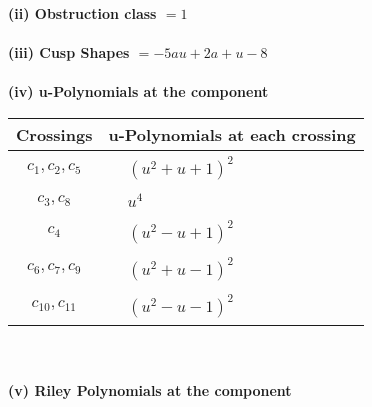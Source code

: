 \documentclass[1p]{elsarticle_modified}
\theoremstyle{definition}
\begin{document}
\flushleft \textbf{(ii) Obstruction class $= 1$}\\~\\
\flushleft \textbf{(iii) Cusp Shapes $= -5 a u+2 a+u-8$}\\~\\
\newpage\renewcommand{\arraystretch}{1}
\flushleft \textbf{(iv) u-Polynomials at the component}\newline \\
\begin{tabular}{m{50pt}|m{274pt}}
Crossings & \hspace{64pt}u-Polynomials at each crossing \\
\hline $$\begin{aligned}c_{1},c_{2},c_{5}\end{aligned}$$&$\begin{aligned}
&(u^2+u+1)^2
\end{aligned}$\\
\hline $$\begin{aligned}c_{3},c_{8}\end{aligned}$$&$\begin{aligned}
&u^4
\end{aligned}$\\
\hline $$\begin{aligned}c_{4}\end{aligned}$$&$\begin{aligned}
&(u^2- u+1)^2
\end{aligned}$\\
\hline $$\begin{aligned}c_{6},c_{7},c_{9}\end{aligned}$$&$\begin{aligned}
&(u^2+u-1)^2
\end{aligned}$\\
\hline $$\begin{aligned}c_{10},c_{11}\end{aligned}$$&$\begin{aligned}
&(u^2- u-1)^2
\end{aligned}$\\
\hline
\end{tabular}\\~\\
\newpage\renewcommand{\arraystretch}{1}
\flushleft \textbf{(v) Riley Polynomials at the component}\newline \\
\end{document}
